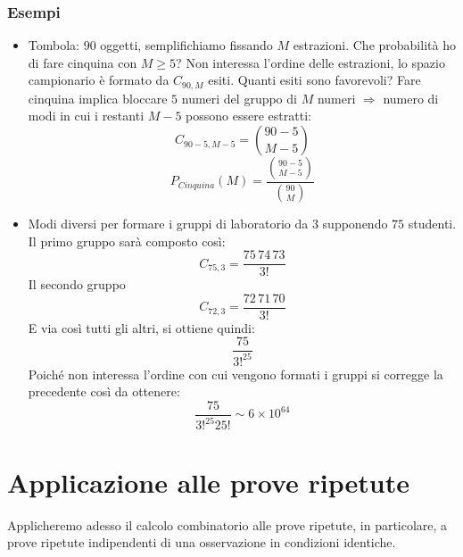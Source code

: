 \documentclass[11pt,a4paper]{book}
\begin{document}
\subsubsection{Esempi}
\begin{itemize}
\item Tombola: $ 90 $ oggetti, semplifichiamo fissando $ M $ estrazioni. Che probabilità ho di fare cinquina con $ M\geq 5  $? Non interessa l'ordine delle estrazioni, lo spazio campionario è formato da $ C_{90,M} $ esiti. Quanti esiti sono favorevoli? Fare cinquina implica bloccare $ 5 $ numeri del gruppo di $ M $ numeri $ \Rightarrow $ numero di modi in cui i restanti $ M-5 $ possono essere estratti:
\begin{equation}
C_{90-5,M-5} = \binom{90-5}{M-5}
\end{equation}
\begin{equation}
P_{\textit{Cinquina}}(M) = \dfrac{\binom{90-5}{M-5}}{\binom{90}{M}}
\end{equation}
\item Modi diversi per formare i gruppi di laboratorio da $ 3 $ supponendo $ 75 $ studenti. Il primo gruppo sarà composto così:
\begin{equation}
C_{75,3} = \frac{75\,74\,73}{3!}
\end{equation}
Il secondo gruppo
\begin{equation}
C_{72,3} = \frac{72 \, 71 \, 70}{3!}
\end{equation}
E via così tutti gli altri, si ottiene quindi:
\begin{equation}
\frac{75}{3!^{25}}
\end{equation}
Poiché non interessa l'ordine con cui vengono formati i gruppi si corregge la precedente così da ottenere:
\begin{equation}
\frac{75}{3!^{25}25!} \sim 6 \times 10^{64}
\end{equation}
\end{itemize}
\section{Applicazione alle prove ripetute}
Applicheremo adesso il calcolo combinatorio alle prove ripetute, in particolare, a prove ripetute indipendenti di una osservazione in condizioni identiche.
\end{document}
